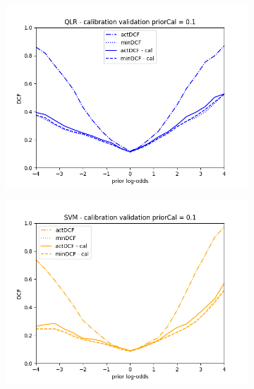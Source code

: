 \begin{figure}[h!]
    \centering
    \begin{subfigure}[b]{0.40\linewidth}
        \includegraphics[width=\linewidth]{Lab/11. Lab 11/Images/CalibrationAndFusion/01. QLR}
        \label{fig:QLRCalibration}
    \end{subfigure}
    \begin{subfigure}[b]{0.40\linewidth}
        \includegraphics[width=\linewidth]{Lab/11. Lab 11/Images/CalibrationAndFusion/02. SVM}
        \label{fig:SVMCalibration}
    \end{subfigure}
    \begin{subfigure}[b]{0.40\linewidth}

\end{subfigure}
\end{figure}
